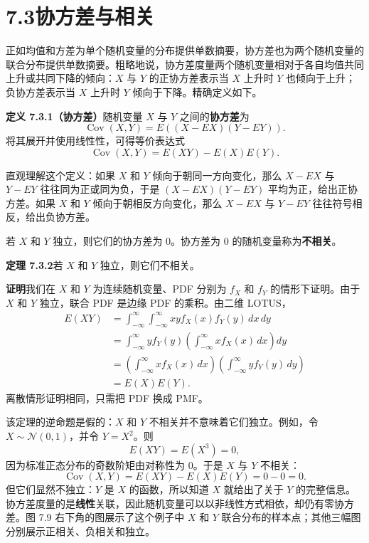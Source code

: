 \documentclass[UTF8, 12pt, fontset=fandol, oneside]{ctexart}
\begin{document}
\section*{7.3\quad 协方差与相关}

正如均值和方差为单个随机变量的分布提供单数摘要，协方差也为两个随机变量的联合分布提供单数摘要。粗略地说，协方差度量两个随机变量相对于各自均值共同上升或共同下降的倾向：$X$ 与 $Y$ 的正协方差表示当 $X$ 上升时 $Y$ 也倾向于上升；负协方差表示当 $X$ 上升时 $Y$ 倾向于下降。精确定义如下。

\noindent\textbf{定义 7.3.1（协方差）}\quad 随机变量 $X$ 与 $Y$ 之间的\textbf{协方差}为
\[
  \operatorname{Cov}(X,Y)=E((X-EX)(Y-EY)).
\]
将其展开并使用线性性，可得等价表达式
\[
  \operatorname{Cov}(X,Y)=E(XY)-E(X)E(Y).
\]

直观理解这个定义：如果 $X$ 和 $Y$ 倾向于朝同一方向变化，那么 $X-EX$ 与 $Y-EY$ 往往同为正或同为负，于是 $(X-EX)(Y-EY)$ 平均为正，给出正协方差。如果 $X$ 和 $Y$ 倾向于朝相反方向变化，那么 $X-EX$ 与 $Y-EY$ 往往符号相反，给出负协方差。

若 $X$ 和 $Y$ 独立，则它们的协方差为 $0$。协方差为 $0$ 的随机变量称为\textbf{不相关}。

\noindent\textbf{定理 7.3.2}\quad 若 $X$ 和 $Y$ 独立，则它们不相关。

\noindent\textbf{证明}\quad 我们在 $X$ 和 $Y$ 为连续随机变量、PDF 分别为 $f_X$ 和 $f_Y$ 的情形下证明。由于 $X$ 和 $Y$ 独立，联合 PDF 是边缘 PDF 的乘积。由二维 LOTUS，
\[
\begin{aligned}
  E(XY)
  &=\int_{-\infty}^{\infty}\int_{-\infty}^{\infty}
  xy f_X(x)f_Y(y)\,dx\,dy\\
  &=\int_{-\infty}^{\infty} y f_Y(y)
    \left(\int_{-\infty}^{\infty}x f_X(x)\,dx\right)dy\\
  &=\left(\int_{-\infty}^{\infty}x f_X(x)\,dx\right)
    \left(\int_{-\infty}^{\infty}y f_Y(y)\,dy\right)\\
  &=E(X)E(Y).
\end{aligned}
\]
离散情形证明相同，只需把 PDF 换成 PMF。

该定理的逆命题是假的：$X$ 和 $Y$ 不相关并不意味着它们独立。例如，令 $X\sim \mathcal{N}(0,1)$，并令 $Y=X^2$。则
\[
  E(XY)=E(X^3)=0,
\]
因为标准正态分布的奇数阶矩由对称性为 $0$。于是 $X$ 与 $Y$ 不相关：
\[
  \operatorname{Cov}(X,Y)=E(XY)-E(X)E(Y)=0-0=0.
\]
但它们显然不独立：$Y$ 是 $X$ 的函数，所以知道 $X$ 就给出了关于 $Y$ 的完整信息。协方差度量的是\textbf{线性}关联，因此随机变量可以以非线性方式相依，却仍有零协方差。图 7.9 右下角的图展示了这个例子中 $X$ 和 $Y$ 联合分布的样本点；其他三幅图分别展示正相关、负相关和独立。
\end{document}
